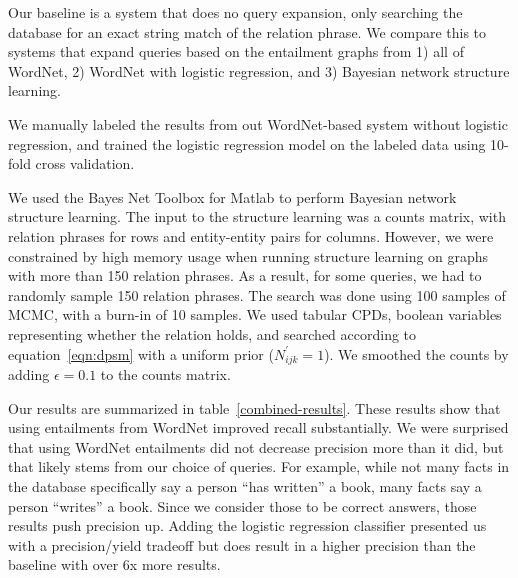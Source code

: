 \documentclass{article}
\begin{document}
Our baseline is a system that does no query expansion, only searching the database for an exact string match of the relation phrase. We compare this to systems that expand queries based on the entailment graphs from 1) all of WordNet, 2) WordNet with logistic regression, and 3) Bayesian network structure learning.

We manually labeled the results from out WordNet-based system without logistic regression, and trained the logistic regression model on the labeled data using 10-fold cross validation.

We used the Bayes Net Toolbox for Matlab \cite{murphy2001bayes} to perform Bayesian network structure learning. The input to the structure learning was a counts matrix, with relation phrases for rows and entity-entity pairs for columns. However, we were constrained by high memory usage when running structure learning on graphs with more than 150 relation phrases. As a result, for some queries, we had to randomly sample 150 relation phrases. The search was done using 100 samples of MCMC, with a burn-in of 10 samples. We used tabular CPDs, boolean variables representing whether the relation holds, and searched according to equation~\ref{eqn:dpsm} with a uniform prior ($N^\prime_{ijk} = 1$). We smoothed the counts by adding $\epsilon = 0.1$ to the counts matrix. 




Our results are summarized in table~\ref{combined-results}. These results show that using entailments from WordNet improved recall substantially. We were surprised that using WordNet entailments did not decrease precision more than it did, but that likely stems from our choice of queries. For example, while not many facts in the database specifically say a person ``has written'' a book, many facts say a person ``writes'' a book. Since we consider those to be correct answers, those results push precision up. Adding the logistic regression classifier presented us with a precision/yield tradeoff but does result in a higher precision than the baseline with over 6x more results.
\end{document}

